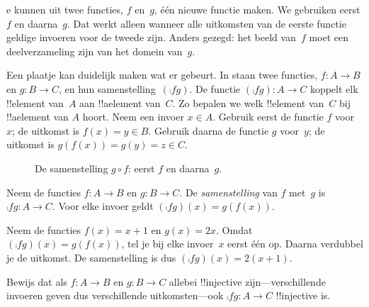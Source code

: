 \documentclass[openany]{memoir}
\begin{document}

\begin{explain}
e
kunnen uit twee functies, $f$ en~$g$, één nieuwe functie maken. We
gebruiken eerst $f$ en daarna~$g$. Dat werkt alleen wanneer alle
uitkomsten van de eerste functie geldige invoeren voor de tweede zijn.
Anders gezegd: het beeld van~$f$ moet een deelverzameling zijn van het
domein van~$g$.

Een plaatje kan duidelijk maken wat er gebeurt. In
 staan twee functies, $f \colon A \to B$ en
$g \colon B \to C$, en hun samenstelling~$(\comp{f}{g})$. De functie
$(\comp{f}{g}) \colon A \to C$ koppelt elk !!{element} van~$A$ aan
!!a{element} van~$C$. Zo bepalen we welk !!{element} van~$C$ bij
!!a{element} van $A$ hoort. Neem een invoer $x \in A$. Gebruik eerst
de functie $f$ voor~$x$; de uitkomst is $f(x) = y \in B$. Gebruik
daarna de functie $g$ voor~$y$; de uitkomst is $g(f(x)) = g(y) = z
\in C$.
\begin{figure}
  \caption{De samenstelling $g \circ f$: eerst $f$ en daarna~$g$.}
\end{figure}
\end{explain}

\begin{defn}[Samenstelling]
Neem de functies $f\colon A \to B$ en $g\colon B \to C$. De
\emph{samenstelling} van $f$ met~$g$ is $\comp{f}{g} \colon A \to C$.
Voor elke invoer geldt $(\comp{f}{g})(x) = g(f(x))$.
\end{defn}

\begin{ex}
Neem de functies $f(x) = x + 1$ en $g(x) = 2x$. Omdat
$(\comp{f}{g})(x) = g(f(x))$, tel je bij elke invoer~$x$ eerst één op.
Daarna verdubbel je de uitkomst. De samenstelling is dus
$(\comp{f}{g})(x) = 2(x+1)$.
\end{ex}

\begin{prob}
Bewijs dat als $f \colon A \to B$ en $g \colon B \to C$ allebei
!!{injective} zijn---verschillende invoeren geven dus verschillende
uitkomsten---ook $\comp{f}{g}\colon A \to C$ !!{injective} is.
\end{prob}
\end{document}

